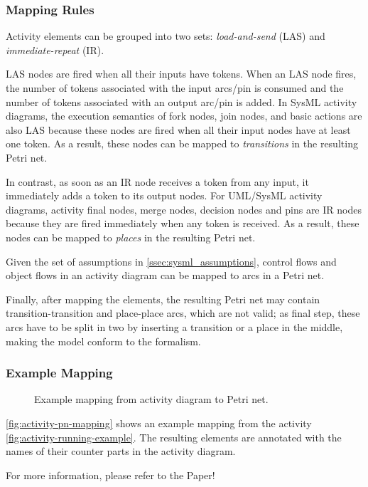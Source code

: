 \subsubsection{Mapping Rules}

Activity elements can be grouped into two sets: \emph{load-and-send} (LAS) and \emph{immediate-repeat} (IR).

LAS nodes are fired when all their inputs have tokens. When an LAS node fires, the number of tokens associated with the input arcs/pin is consumed and the number of tokens associated with an output arc/pin is added. In SysML activity diagrams, the execution semantics of fork nodes, join nodes, and basic actions are also LAS because these nodes are fired when all their input nodes have at least one token. As a result, these nodes can be mapped to \emph{transitions} in the resulting Petri net.

In contrast, as soon as an IR node receives a token from any input, it immediately adds a token to its output nodes. For UML/SysML activity diagrams, activity final nodes, merge nodes, decision nodes and pins are IR nodes because they are fired immediately when any token is received. As a result, these nodes can be mapped to \emph{places} in the resulting Petri net.

Given the set of assumptions in \autoref{ssec:sysml_assumptions}, control flows and object flows in an activity diagram can be mapped to arcs in a Petri net.

Finally, after mapping the elements, the resulting Petri net may contain transition-transition and place-place arcs, which are not valid; as final step, these arcs have to be split in two by inserting a transition or a place in the middle, making the model conform to the formalism.

\subsubsection{Example Mapping}

\begin{figure}[!ht]
	\centering
	
	\caption{Example mapping from activity diagram to Petri net.}
	\label{fig:activity-pn-mapping}
\end{figure}

\autoref{fig:activity-pn-mapping} shows an example mapping from the activity \autoref{fig:activity-running-example}. The resulting elements are annotated with the names of their counter parts in the activity diagram.

For more information, please refer to the Paper!